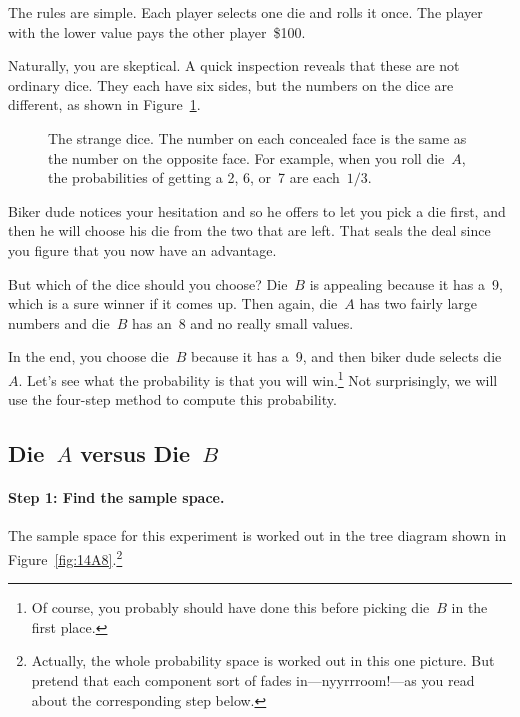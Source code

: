 The rules are simple.  Each player selects one die and rolls it once.
The player with the lower value pays the other player~\$100.

Naturally, you are skeptical.  A quick inspection reveals that these
are not ordinary dice.  They each have six sides, but the numbers on
the dice are different, as shown in Figure~\ref{fig:14A7}.

\begin{figure}


\caption{The strange dice.  The number on each concealed face
  is the same as the number on the opposite face.  For example, when
  you roll die~$A$, the probabilities of getting a 2, 6, or~7 are
  each~$1/3$.}

\label{fig:14A7}

\end{figure}

Biker dude notices your hesitation and so he offers to let you pick a
die first, and then he will choose his die from the two that are
left.  That seals the deal since you figure that you now have an
advantage.

But which of the dice should you choose?  Die~$B$ is appealing because
it has a~9, which is a sure winner if it comes up.  Then again,
die~$A$ has two fairly large numbers and die~$B$ has an~8 and no
really small values.

In the end, you choose die~$B$ because it has a~9, and then biker dude
selects die~$A$.  Let's see what the probability is that you will
win.\footnote{Of course, you probably should have done this before
  picking die~$B$ in the first place.}  Not surprisingly, we will use
the four-step method to compute this probability.

\subsection{Die~$A$ versus Die~$B$}

\paragraph{Step 1: Find the sample space.}

The sample space for this experiment is worked out in the tree diagram
shown in Figure~\ref{fig:14A8}.\footnote{Actually, the whole
  probability space is worked out in this one picture.  But pretend
  that each component sort of fades in---nyyrrroom!---as you read
  about the corresponding step below.}

